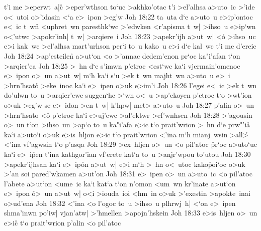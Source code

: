 t'i
me
>eperwt~a|c\r{}
>eper'wthson
to`uc
>akhko'otac
t'i
>el'alhsa
a>uto~ic
>'ide
o<~utoi
o>'idasin
<`a
e>~ipon
>eg'w\bibvsend
\vs Joh 18:22
ta~uta
d`e
a>uto~u
e>ip'ontoc
e<~ic
t~wn\r{}
<uphret~wn
paresthk`wc
>'edwken
<r'apisma
t~w|
>ihso~u
e>ip`wn
o<'utwc
>apokr'inh|
t~w|
>arqiere~i\bibvsend
\vs Joh 18:23
>apekr'ijh
a>ut~w|
<o\r{}
>ihso~uc
e>i
kak~wc
>el'alhsa
mart'urhson
per`i
to~u
kako~u
e>i
d`e
kal~wc
t'i
me
d'ereic\bibvsend
\vs Joh 18:24
>ap'esteile\r{n}
a>ut`on
<o
>'annac
dedem'enon
pr`oc
ka"i'afan
t`on
>arqier'ea\bibvsend
\vs Joh 18:25
>~hn
d`e
s'imwn
p'etroc
<est`wc
ka`i
vjermain'omenoc
e>~ipon
o>~un
a>ut~w|
m`h
ka`i
s`u
>ek
t~wn
majht~wn
a>uto~u
e>~i
>hrn'hsat\r{o}
>eke~inoc
ka`i
e>~ipen
o>uk
e>im'i\bibvsend
\vs Joh 18:26
l'egei
e<~ic
>ek
t~wn
do'ulwn
to~u
>arqier'ewc
suggen`hc
>`wn
o<~u
>ap'ekoyen
p'etroc
t`o
>wt'ion
o>uk
>eg'w
se
e>~idon
>en
t~w|
k'hpw|
met>
a>uto~u\bibvsend
\vs Joh 18:27
p'alin
o>~un
>hrn'hsato
<o\r{}
p'etroc
ka`i
e>uj'ewc
>al'ektwr
>ef'wnhsen\bibvsend
\vs Joh 18:28
>'agousin
o>~un
t`on
>ihso~un
>ap`o
to~u
ka"i'afa
e>ic
t`o
prait'wrion
>~hn
d`e
prw"'i\r{a}
ka`i
a>uto`i
o>uk
e>is~hljon
e>ic
t`o
prait'wrion
<'ina
m`h
mianj~wsin
>all>\r{}
<'ina
vf'agwsin
t`o
p'asqa\bibvsend
\vs Joh 18:29
>ex~hljen
o>~un
<o
pil'atoc
\r{p}r`oc
a>uto`uc
ka`i
e>~i\r{p}en
t'ina
kathgor'ian
vf'erete
kat`a
to~u
>anjr'wpou
to'utou\bibvsend
\vs Joh 18:30
>apekr'ijhsan
ka`i
e>~ip\r{o}n
a>ut~w|
e>i
m`h
>~hn
o<~utoc
kako\r{p}oi`oc
o>uk
>'an
soi
pared'wkamen
a>ut'on\bibvsend
\vs Joh 18:31
e>~ipen
o>~un
a>uto~ic
<o
pil'atoc
l'abete
a>ut`on
<ume~ic
ka`i
kat`a
t`on
n'omon
<um~wn
kr'inate
a>ut`on
e>~ipon
\r{o}>~un
a>ut~w|
o<i
>iouda~ioi
<hm~in
o>uk
>'exestin
>apokte~inai
o>ud'ena\bibvsend
\vs Joh 18:32
<'ina
<o
l'ogoc
to~u
>ihso~u
plhrwj~h|
<`on
e>~ipen
shma'inwn
po'iw|
vjan'atw|
>'hmellen
>apojn'hskein\bibvsend
\vs Joh 18:33
e>is~hljen
o>~un
e>ic\r{}
t`o
prait'wrion
p'alin
<o
pil'atoc

